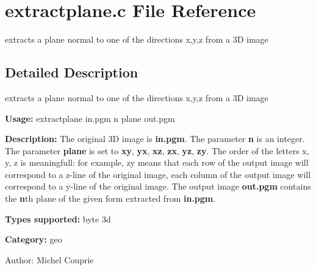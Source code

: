 \section{extractplane.c File Reference}
\label{extractplane_8c}
extracts a plane normal to one of the directions x,y,z from a 3D image 



\subsection{Detailed Description}
extracts a plane normal to one of the directions x,y,z from a 3D image 

{\bf Usage:} extractplane in.pgm n plane out.pgm

{\bf Description:} The original 3D image is {\bf in.pgm}. The parameter {\bf n} is an integer. The parameter {\bf plane} is set to {\bf xy}, {\bf yx}, {\bf xz}, {\bf zx}, {\bf yz}, {\bf zy}. The order of the letters x, y, z is meaningfull: for example, zy means that each row of the output image will correspond to a z-line of the original image, each column of the output image will correspond to a y-line of the original image. The output image {\bf out.pgm} contains the {\bf n}th plane of the given form extracted from {\bf in.pgm}.

{\bf Types supported:} byte 3d

{\bf Category:} geo

\begin{Desc}
\item[Author:]Michel Couprie \end{Desc}
